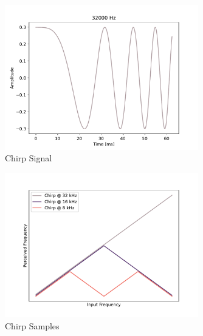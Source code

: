 \documentclass[11pt]{texMemo-gibbons}
\begin{document}
\begin{figure}
  \centering
  \includegraphics[width=0.75\textwidth]{figures/chirp_32000.pdf}
  \caption{Chirp Signal}
  \label{fig:chirp}
\end{figure}

\begin{figure}
  \centering
  \includegraphics[width=0.75\textwidth]{figures/chirp_samples.pdf}
  \caption{Chirp Samples}
  \label{fig:chirp_samples}
\end{figure}
\end{document}

